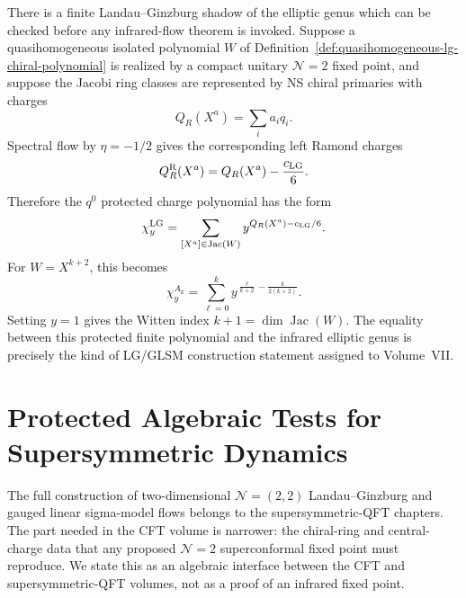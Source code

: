 There is a finite Landau--Ginzburg shadow of the elliptic genus which can be
checked before any infrared-flow theorem is invoked.  Suppose a
quasihomogeneous isolated polynomial \(W\) of
Definition~\ref{def:quasihomogeneous-lg-chiral-polynomial} is realized by a
compact unitary \(\mathcal N=2\) fixed point, and suppose the Jacobi ring
classes are represented by NS chiral primaries with charges
\[
  Q_R(X^a)=\sum_i a_i q_i .
\]
Spectral flow by \(\eta=-1/2\) gives the corresponding left Ramond charges
\begin{equation}
  Q_R^{\mathrm R}(X^a)
  =
  Q_R(X^a)-\frac{c_{\rm LG}}6 .
  \label{eq:lg-ramond-charge-from-ns-chiral-primary}
\end{equation}
Therefore the \(q^0\) protected charge polynomial has the form
\begin{equation}
  \chi_y^{\rm LG}
  =
  \sum_{[X^a]\in\operatorname{Jac}(W)}
  y^{Q_R(X^a)-c_{\rm LG}/6}.
  \label{eq:lg-chi-y-polynomial}
\end{equation}
For \(W=X^{k+2}\), this becomes
\begin{equation}
  \chi_y^{A_k}
  =
  \sum_{\ell=0}^k
  y^{\frac{\ell}{k+2}-\frac{k}{2(k+2)}}.
  \label{eq:a-series-chi-y-polynomial}
\end{equation}
Setting \(y=1\) gives the Witten index \(k+1=\dim\operatorname{Jac}(W)\).
The equality between this protected finite polynomial and the infrared
elliptic genus is precisely the kind of LG/GLSM construction statement
assigned to Volume~VII.

\section{Protected Algebraic Tests for Supersymmetric Dynamics}

The full construction of two-dimensional \(\mathcal N=(2,2)\)
Landau--Ginzburg and gauged linear sigma-model flows belongs to the
supersymmetric-QFT chapters.  The part needed in the CFT volume is narrower:
the chiral-ring and central-charge data that any proposed
\(\mathcal N=2\) superconformal fixed point must reproduce.  We state this
as an algebraic interface between the CFT and supersymmetric-QFT volumes, not
as a proof of an infrared fixed point.

